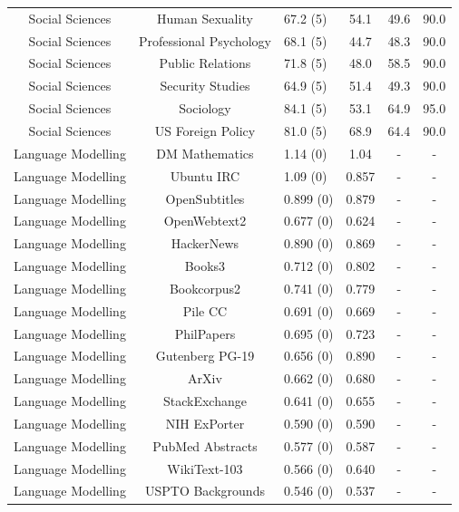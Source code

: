 \documentclass[11pt, a4paper, logo, internal, copyright, nonumbering]{deepmind}
\begin{document}
\begin{center}
\begin{longtable}{cclccc}
        Social Sciences &                      Human Sexuality &   67.2 (5) &  54.1 &  49.6 &         90.0 \\
        Social Sciences &              Professional Psychology &   68.1 (5) &  44.7 &  48.3 &         90.0 \\
        Social Sciences &                     Public Relations &   71.8 (5) &  48.0 &  58.5 &         90.0 \\
        Social Sciences &                     Security Studies &   64.9 (5) &  51.4 &  49.3 &         90.0 \\
        Social Sciences &                            Sociology &   84.1 (5) &  53.1 &  64.9 &         95.0 \\
        Social Sciences &                    US Foreign Policy &   81.0 (5) &  68.9 &  64.4 &         90.0 \\
Language Modelling & DM Mathematics    &  1.14 (0) &  1.04 &  - & -  \\
Language Modelling & Ubuntu IRC        &  1.09 (0) &  0.857 &   - & -\\
Language Modelling & OpenSubtitles     &  0.899 (0) &  0.879 &   - & - \\
Language Modelling & OpenWebtext2     &  0.677 (0) &   0.624 &  - & -\\
Language Modelling & HackerNews        &  0.890 (0) &  0.869 &   - & - \\
Language Modelling & Books3            &  0.712 (0) &  0.802 &  - & -\\
Language Modelling & Bookcorpus2       &  0.741 (0) & 0.779 &  - & -\\
Language Modelling & Pile CC           &  0.691 (0) & 0.669 &   - & -\\
Language Modelling & PhilPapers        &  0.695 (0) &  0.723 &  - & -\\
Language Modelling & Gutenberg PG-19   &  0.656 (0) &  0.890 &  - & -\\
Language Modelling & ArXiv             &  0.662 (0) &  0.680 &   - & -\\
Language Modelling & StackExchange     &  0.641 (0) &  0.655 &   - & -\\
Language Modelling & NIH ExPorter      &  0.590 (0) &  0.590 &   - & -\\
Language Modelling & PubMed Abstracts  &  0.577 (0) &  0.587 &  - & -\\
Language Modelling & WikiText-103      &  0.566 (0) &  0.640 &  - & - \\
Language Modelling & USPTO Backgrounds &  0.546 (0) &  0.537 &  - & - \\

\end{longtable}
\end{center}
\end{document}
